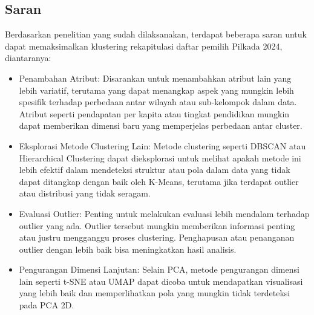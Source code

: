 \subsection{Saran}
Berdasarkan penelitian yang sudah dilaksanakan, terdapat beberapa saran untuk dapat memaksimalkan klustering rekapitulasi daftar pemilih Pilkada 2024, diantaranya:
\begin{itemize}
    \item Penambahan Atribut: Disarankan untuk menambahkan atribut lain yang lebih variatif, terutama yang dapat menangkap aspek yang mungkin lebih spesifik terhadap perbedaan antar wilayah atau sub-kelompok dalam data. Atribut seperti pendapatan per kapita atau tingkat pendidikan mungkin dapat memberikan dimensi baru yang memperjelas perbedaan antar cluster.
    \item Eksplorasi Metode Clustering Lain: Metode clustering seperti DBSCAN atau Hierarchical Clustering dapat dieksplorasi untuk melihat apakah metode ini lebih efektif dalam mendeteksi struktur atau pola dalam data yang tidak dapat ditangkap dengan baik oleh K-Means, terutama jika terdapat outlier atau distribusi yang tidak seragam.
    \item Evaluasi Outlier: Penting untuk melakukan evaluasi lebih mendalam terhadap outlier yang ada. Outlier tersebut mungkin memberikan informasi penting atau justru mengganggu proses clustering. Penghapusan atau penanganan outlier dengan lebih baik bisa meningkatkan hasil analisis.
    \item Pengurangan Dimensi Lanjutan: Selain PCA, metode pengurangan dimensi lain seperti t-SNE atau UMAP dapat dicoba untuk mendapatkan visualisasi yang lebih baik dan memperlihatkan pola yang mungkin tidak terdeteksi pada PCA 2D.
\end{itemize}